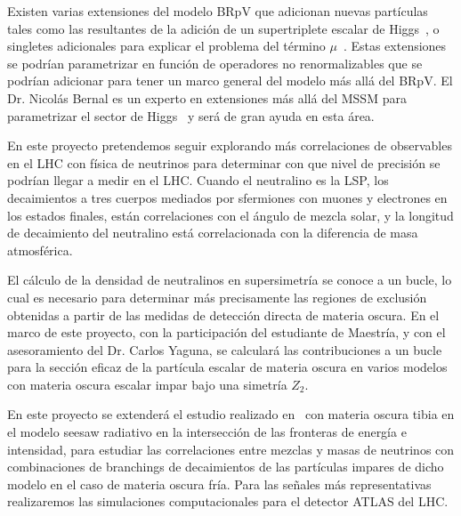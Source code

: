 \begin{bbrpvlhc}
  Existen varias extensiones del modelo BRpV que adicionan nuevas
  partículas tales como las resultantes de la adición de un
  supertriplete escalar de Higgs~\cite{AristizabalSierra:2003ix}, o
  singletes adicionales para explicar el problema del término
  $\mu$~\cite{LopezFogliani:2005yw}. Estas extensiones se podrían
  parametrizar en función de operadores no renormalizables que se
  podrían adicionar para tener un marco general del modelo más allá
  del BRpV. El Dr. Nicolás Bernal es un experto en extensiones más
  allá del MSSM para parametrizar el sector de
  Higgs~\cite{Bernal:2007uv,Bernal:2009hd} y será de gran ayuda en
  esta área.
\end{bbrpvlhc}

\begin{brpvlhc}
  En este proyecto pretendemos seguir explorando más correlaciones
  de observables en el LHC con física de neutrinos para determinar con
  que nivel de precisión se podrían llegar a medir en el LHC. Cuando
  el neutralino es la LSP, los decaimientos a tres cuerpos mediados
  por sfermiones con muones y electrones en los estados finales, están
  correlaciones con el ángulo de mezcla solar, y la longitud de
  decaimiento del neutralino está correlacionada con la diferencia de
  masa atmosférica.
\end{brpvlhc}


\begin{darkmatter}
  El cálculo de la densidad de neutralinos en supersimetría se conoce
  a un bucle, lo cual es necesario para determinar más precisamente las
  regiones de exclusión obtenidas a partir de las medidas de detección
  directa de materia oscura. En el marco de este proyecto,
  con la participación del estudiante de Maestría, y con el
  asesoramiento del Dr. Carlos Yaguna, se 
  calculará las contribuciones a un bucle  para la sección eficaz de la
  partícula escalar de materia oscura en varios  modelos con materia oscura
  escalar impar bajo una simetría $Z_2$.

  En este proyecto se extenderá el estudio realizado
  en~\cite{Sierra:2008wj} con materia oscura tibia en el modelo seesaw
  radiativo en la intersección de las fronteras de energía e
  intensidad, para estudiar las correlaciones entre mezclas y masas de
  neutrinos con combinaciones de branchings de decaimientos de las
  partículas impares de dicho modelo en el caso de materia oscura
  fría. Para las señales más representativas realizaremos las
  simulaciones computacionales para el detector ATLAS del LHC.
\end{darkmatter}



